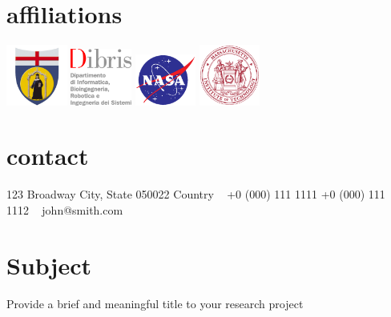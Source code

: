 \documentclass[]{cv-style} %
\begin{document}
\lastupdated


\begin{aside}
\section{affiliations}
%
\includegraphics[width=2cm]{logos/logo_unige.jpg}
\includegraphics[width=2cm]{logos/dibris.eps}
\includegraphics[width=2cm]{logos/NASA.eps}
\includegraphics[width=2cm]{logos/MIT.eps}
%
\section{contact}
123 Broadway
City, State 050022
Country
~
+0 (000) 111 1111
+0 (000) 111 1112
~
john@smith.com
\end{aside}


\section{Subject}
 \vspace{-0.2cm}
Provide a brief and meaningful title to your research project
\end{document}
